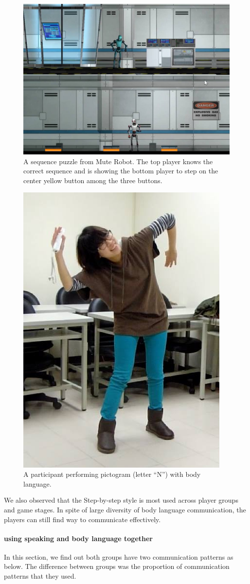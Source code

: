 \begin{figure}[!h]
\centering
\includegraphics[width=0.7\columnwidth]{Figures/US_F2.jpg}
\caption{A sequence puzzle from Mute Robot. The top player knows the correct sequence and is showing the bottom player to step on the center yellow button among the three buttons.}
\label{fig:US_F2}
\end{figure}

\begin{figure}[!h]
\centering
\includegraphics[width=0.4\columnwidth]{Figures/US_F3.jpg}
\caption{A participant performing pictogram (letter “N”) with body language.}
\label{fig:US_F3}
\end{figure}

We also observed that the Step-by-step style is most used across player groups and game stages. In spite of large diversity of body language communication, the players can still find way to communicate effectively.

\paragraph{using speaking and body language together}
In this section, we find out both groups have two communication patterns as below. The difference between groups was the proportion of communication patterns that they used.

